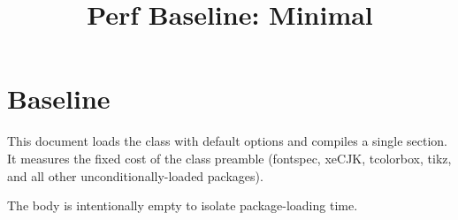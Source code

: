 \documentclass{SUSTechHomework}
\title{Perf Baseline: Minimal}
\begin{document}
\maketitle

\section{Baseline}

This document loads the class with default options and compiles a single section.
It measures the fixed cost of the class preamble (fontspec, xeCJK, tcolorbox,
tikz, and all other unconditionally-loaded packages).

The body is intentionally empty to isolate package-loading time.
\end{document}
